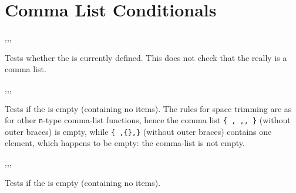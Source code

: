 \documentclass[oneside]{book}
\begin{document}
\section{Comma List Conditionals}

\begin{function}{\ClistIfExist,\ClistIfExistT,\ClistIfExistF,\ClistIfExistTF}
\begin{syntax}
 
  
  
   
\end{syntax}
Tests whether the  is currently defined.  This does
not check that the  really is a comma list.
\begin{demohigh}
\ClistIfExistTF {} {}
\ClistIfExistTF {} {}
\end{demohigh}
\end{function}

\begin{function}{\ClistIfEmpty,\ClistIfEmptyT,\ClistIfEmptyF,\ClistIfEmptyTF}
\begin{syntax}
 
  
  
   
\end{syntax}
Tests if the  is empty (containing no items).
The rules for space trimming are as for other \texttt{n}-type
comma-list functions, hence the comma list \verb|{ , ,, }| (without
outer braces) is empty, while \verb|{ ,{},}| (without outer braces)
contains one element, which happens to be empty: the comma-list
is not empty.
\begin{demohigh}
 {} {}
\ClistIfEmptyTF { , } {} {}
\end{demohigh}
\end{function}

\begin{function}{\ClistVarIfEmpty,\ClistVarIfEmptyT,\ClistVarIfEmptyF,\ClistVarIfEmptyTF}
\begin{syntax}
 
  
  
   
\end{syntax}
Tests if the  is empty (containing no items).
\begin{demohigh}
\ClistSet {}
\ClistVarIfEmptyTF {} {}
\ClistClear \lTmpaClist
\ClistVarIfEmptyTF {} {}
\end{demohigh}
\end{function}
\end{document}
